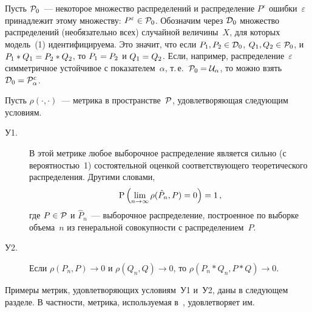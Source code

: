 \begin{multicols}{2}
Пусть ${\cal P}_0$~--- некоторое множество распределений и
распределение $P^\varepsilon$ ошибки~$\varepsilon$ принадлежит этому
множеству: $P^\varepsilon\in{\cal P}_0$. Обозначим через ${\cal D}_0$ 
множество распределений (необязательно всех) случайной
величины~$X$, для которых модель~(1) идентифицируема. Это значит,
что если $P_1,P_2\hm\in{\cal D}_0$, $Q_1,Q_2\hm\in{\cal P}_0$, и $P_1\ast
Q_1\hm=P_2\ast Q_2$, то $P_1\hm=P_2$ и $Q_1\hm=Q_2$. Если, например,
распределение~$\varepsilon$ сим\-мет\-рич\-ное устойчивое с показателем~$\alpha$, 
т.\,е.\ ${\cal P}_0\hm={\cal U}_\alpha$, то можно взять ${\cal D}_0\hm={\cal P}_\alpha^c$.

Пусть $\rho(\cdot,\cdot)$~--- метрика в пространстве~${\cal P}$,
удовлетворяющая следующим условиям.
\begin{description}
\item[У1.] В этой метрике любое выборочное распределение является
сильно (с вероятностью~1) состоятельной оценкой соответствующего
теоретического распределения. Другими словами,
$$
{\rm P}\left(\lim_{n\to\infty}\rho(\hat P_n,P)=0\right)=1\,,
$$
где $P\in{\cal P}$ и $\hat P_n$~--- выборочное распределение,
построенное по выборке объема~$n$ из генеральной совокупности
с распределением~$P$.
\item[У2.] Если $\rho(P_n,P)\to0$ и $\rho(Q_n,Q)\to0$, то
$\rho(P_n\ast Q_n,P\ast Q)\to0$.
\end{description}

Примеры метрик, удовлетворяющих условиям~У1 и~У2, даны в следующем
разделе. В частности, метрика, используемая в~\cite{2-us}, удовлетворяет им.


\end{multicols}
